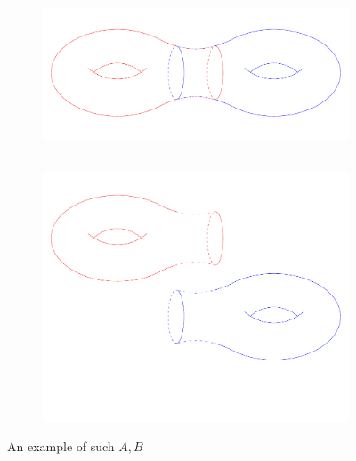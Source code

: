 \begin{figure}[H]
  \centering
  \begin{subfigure}{.4\linewidth}
    \includegraphics[width=\linewidth, keepaspectratio]{figures/mayer-vie-torus}
  \end{subfigure}
  \begin{subfigure}{.18\linewidth}
  \end{subfigure}
  \begin{subfigure}{.4\linewidth}
    \hspace{-.8cm}
    ~\vspace{-.5cm}
    \includegraphics[width=\linewidth, keepaspectratio]{figures/mayer-vie-torus-sep}
  \end{subfigure}
  \caption{An example of such $A,B$}
\end{figure}

